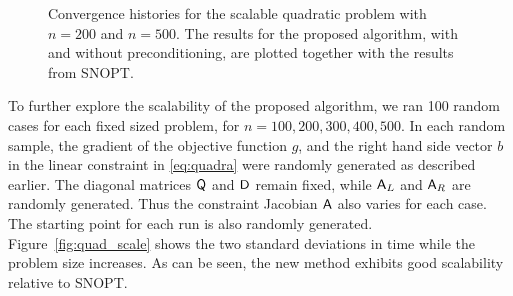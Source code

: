 \begin{figure}[tbp]
  \centering
   \hspace{1em}
   \caption{Convergence histories for the scalable quadratic problem with $n=200$ and
  $n=500$. The results for the proposed algorithm, with and without
  preconditioning, are plotted together with the results from
  SNOPT.\label{fig:quad_hist}}
\end{figure}

To further explore the scalability of the proposed algorithm, we ran 100 random cases for 
each fixed sized problem, for $n = 100, 200, 300, 400, 500$.  In each random sample, the gradient 
of the objective function $g$, and the right hand side vector $b$ in the linear constraint in \eqref{eq:quadra} 
were randomly generated as described earlier. The diagonal matrices $\mathsf{Q}$ and $\mathsf{D}$ remain fixed, while $\mathsf{A}_L$ and $\mathsf{A}_R$ are randomly generated. Thus the constraint Jacobian $\mathsf{A}$ 
also varies for each case. 
The starting point for each run is also randomly generated. Figure~\ref{fig:quad_scale} shows the two standard deviations in time while
the problem size increases. As can be seen, the new method exhibits good scalability relative to SNOPT. 

